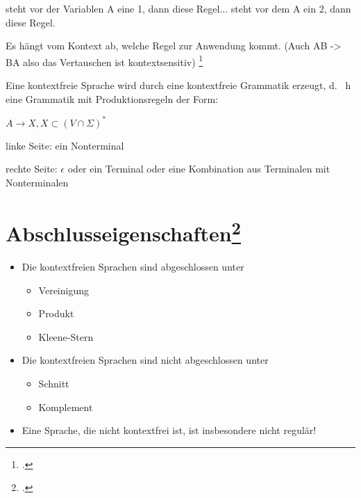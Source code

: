 \documentclass{lehramt-informatik-haupt}
\begin{document}
steht vor der Variablen A eine 1, dann
diese Regel...
steht vor dem A ein 2, dann diese Regel.

Es hängt vom Kontext ab, welche Regel zur Anwendung kommt.
(Auch AB -> BA also das Vertauschen ist kontextsensitiv)
\footcite[Seite 9]{theo:fs:2}

Eine kontextfreie Sprache wird durch eine kontextfreie Grammatik
erzeugt, d. \, h eine Grammatik mit Produktionsregeln der Form:

$A \rightarrow X, X \subset (V \cap \Sigma)^*$

linke Seite: ein Nonterminal

rechte Seite: $\epsilon$ oder ein Terminal oder eine
Kombination aus Terminalen mit
Nonterminalen

%

\section{Abschlusseigenschaften\footcite[Seite 77]{theo:fs:2}}

\begin{itemize}
\item Die kontextfreien Sprachen sind abgeschlossen unter

\begin{itemize}
\item Vereinigung
\item Produkt
\item Kleene-Stern
\end{itemize}

\item Die kontextfreien Sprachen sind nicht abgeschlossen unter

\begin{itemize}
\item Schnitt
\item Komplement
\end{itemize}

\item Eine Sprache, die nicht kontextfrei ist, ist insbesondere nicht
regulär!

\end{itemize}

%
\end{document}
